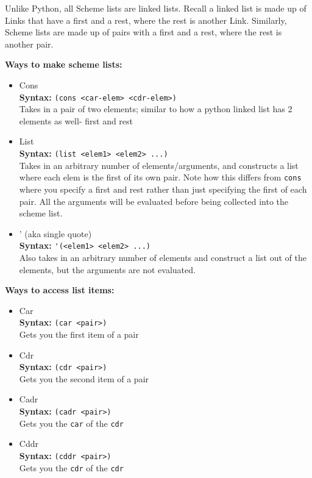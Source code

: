 Unlike Python, all Scheme lists are linked lists. Recall a linked list is made up of Links that have a first and a rest, where the rest is another Link. Similarly, Scheme lists are made up of pairs with a first and a rest, where the rest is another pair.

\textbf{Ways to make scheme lists:}
\begin{itemize}
\item Cons \\
\textbf{Syntax:} \lstinline{(cons <car-elem> <cdr-elem>)} \\
Takes in a pair of two elements; similar to how a python linked list has 2 elements as well- first and rest
\item List \\
\textbf{Syntax:} \lstinline{(list <elem1> <elem2> ...)} \\
Takes in an arbitrary number of elements/arguments, and constructs a list where each elem is the first of its own pair. Note how this differs from \lstinline{cons} where you specify a first and rest rather than just specifying the first of each pair. All the arguments will be evaluated before being collected into the scheme list.
\item ' (aka single quote) \\
\textbf{Syntax:} \lstinline{'(<elem1> <elem2> ...)} \\
Also takes in an arbitrary number of elements and construct a list out of the elements, but the arguments are not evaluated.
\end{itemize}

\textbf{Ways to access list items:}
\begin{itemize}
\item Car \\
\textbf{Syntax:} \lstinline{(car <pair>)} \\
Gets you the first item of a pair
\item Cdr \\
\textbf{Syntax:} \lstinline{(cdr <pair>)} \\
Gets you the second item of a pair
\end{itemize}
\begin{itemize}
\item Cadr \\
\textbf{Syntax:} \lstinline{(cadr <pair>)} \\
Gets you the \lstinline{car} of the \lstinline{cdr}
\end{itemize}
\begin{itemize}
\item Cddr \\
\textbf{Syntax:} \lstinline{(cddr <pair>)} \\
Gets you the \lstinline{cdr} of the \lstinline{cdr}
\end{itemize}

